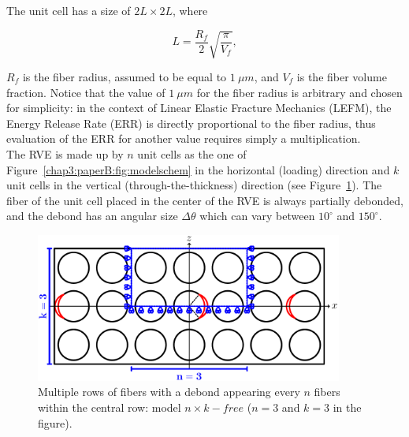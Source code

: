 The unit cell has a size of $2L\times2L$, where

\begin{equation}\label{chap3:paperB:eq:LVf}
L=\frac{R_{f}}{2}\sqrt{\frac{\pi}{V_{f}}},
\end{equation}

$R_{f}$ is the fiber radius, assumed to be equal to $1\ \mu m$, and $V_{f}$ is the fiber volume fraction. Notice that the value of $1\ \mu m$ for the fiber radius is arbitrary and chosen for simplicity: in the context of Linear Elastic Fracture Mechanics (LEFM), the Energy Release Rate (ERR) is directly proportional to the fiber radius, thus evaluation of the ERR for another value requires simply a multiplication.\\
The RVE is made up by $n$ unit cells as the one of Figure~\ref{chap3:paperB:fig:modelschem} in the horizontal (loading) direction and $k$ unit cells in the vertical (through-the-thickness) direction (see Figure~\ref{chap3:paperB:fig:thickply}). The fiber of the unit cell placed in the center of the RVE is always partially debonded, and the debond has an angular size $\Delta\theta$ which can vary between $10^{\circ}$ and $150^{\circ}$.

\begin{figure}[!h]
    \includegraphics[width=0.9\textwidth]{paperB/thickPly.pdf}
    \caption{Multiple rows of fibers with a debond appearing every $n$ fibers within the central row: model $n\times k-free$ ($n=3$ and $k=3$ in the figure).}\label{chap3:paperB:fig:thickply}
\end{figure}

